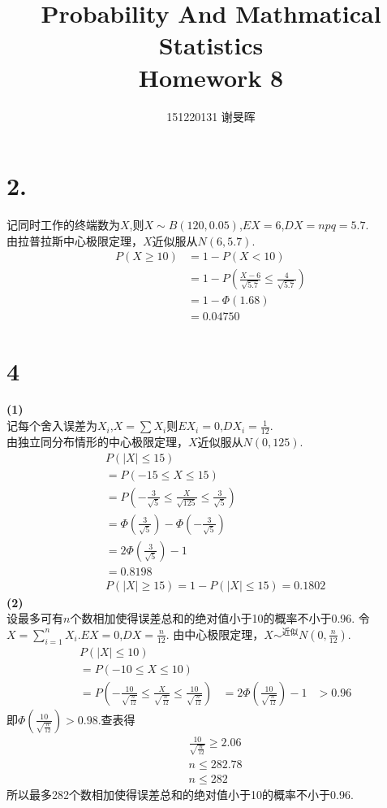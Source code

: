 \documentclass[a4paper,twocolumn]{ctexart}
\title{Probability And Mathmatical Statistics\\Homework 8}
\author{151220131 谢旻晖}
\date{}
\begin{document}
\maketitle
\section*{2.}
\noindent 记同时工作的终端数为$X$,则$X\sim B(120,0.05)$,$EX=6$,$DX=npq=5.7$.\\
由拉普拉斯中心极限定理，$X$近似服从$N(6,5.7)$.
\begin{align*}
P(X\ge 10)&=1-P(X<10)\\
&=1-P(\frac{X-6}{\sqrt{5.7}}\le \frac{4}{\sqrt{5.7}})\\
&=1-\Phi(1.68)\\
&=0.04750
\end{align*}
\section*{4}
\noindent\textbf{(1)}\\
记每个舍入误差为$X_i$,$X=\sum X_i$则$EX_i=0$,$DX_i=\frac{1}{12}$.\\
由独立同分布情形的中心极限定理，$X$近似服从$N(0,125)$.\\
\begin{align*}
&P(|X|\le 15)\\
&=P(-15\le X \le 15)\\
&=P(-\frac{3}{\sqrt{5}}\le \frac{X}{\sqrt{125}} \le \frac{3}{\sqrt{5}})\\
&=\Phi(\frac{3}{\sqrt{5}})-\Phi(-\frac{3}{\sqrt{5}})\\
&=2\Phi(\frac{3}{\sqrt{5}})-1\\
&=0.8198\\
&P(|X|\ge 15)=1-P(|X|\le 15)=0.1802
\end{align*}
\noindent\textbf{(2)}\\
设最多可有$n$个数相加使得误差总和的绝对值小于10的概率不小于0.96.
令$X=\sum_{i=1}^{n}X_i$.$EX=0$,$DX=\frac{n}{12}$.
由中心极限定理，$X\sim^{\text{近似}}N(0,\frac{n}{12})$.
\begin{align*}
&P(|X|\le 10)\\
&=P(-10\le X \le 10)\\
&=P(-\frac{10}{\sqrt{\frac{n}{12}}} \le \frac{X}{\sqrt{\frac{n}{12}}} \le \frac{10}{\sqrt{\frac{n}{12}}})
&=2\Phi(\frac{10}{\sqrt{\frac{n}{12}}})-1
&> 0.96
\end{align*}
即$\Phi(\frac{10}{\sqrt{\frac{n}{12}}})>0.98$.查表得
\begin{align*}
&\frac{10}{\sqrt{\frac{n}{12}}}\ge 2.06\\
&n\le 282.78\\
&n \le 282
\end{align*}
所以最多282个数相加使得误差总和的绝对值小于10的概率不小于0.96.
\end{document}
